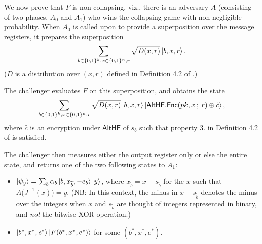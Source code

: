 \documentclass{article}
\begin{document}
We now prove that $F$ is non-collapsing, viz., there is an adversary $A$ (consisting of two phases, $A_0$ and $A_1$) who wins the collapsing game with non-negligible probability. When $A_0$ is called upon to provide a superposition over the message registers, it prepares the superposition
\begin{align}
    \sum_{b \in \{0,1\}^k, x \in \{0,1\}^n, r} \sqrt{D(x, r)} \ket{b, x, r}.
\end{align}
($D$ is a distribution over $(x, r)$ defined in Definition 4.2 of \cite{mahadev}.)

The challenger evaluates $F$ on this superposition, and obtains the state
\begin{align}
    \sum_{b \in \{0,1\}^k, x \in \{0,1\}^n, r} \sqrt{D(x, r)} \ket{b, x, r} \ket{\textsf{AltHE.Enc}(pk, x \:;\: r) \oplus \hat c},
\end{align}
where $\hat c$ is an encryption under $\textsf{AltHE}$ of $s_b$ such that property 3. in Definition 4.2 of \cite{mahadev} is satisfied.

The challenger then measures either the output register only or else the entire state, and returns one of the two following states to $A_1$:

\begin{itemize}
    \item $\ket{\psi_y} = \sum_{b} \alpha_{b} \ket{b, x_{\widetilde{b}}, -e_b} \ket{y}$, where $x_{\widetilde{b}} = x - s_{\widetilde{b}}$ for the $x$ such that $A\big( J^{-1}(x) \big) = y$. (NB: In this context, the minus in $x - s_{\widetilde{b}}$ denotes the minus over the integers when $x$ and $s_{\widetilde{b}}$ are thought of integers represented in binary, and \textit{not} the bitwise XOR operation.)
    \item $\ket{b^*, x^*, e^*} \ket{F(b^*, x^*, e^*)}$ for some $(b^*, x^*, e^*)$.
\end{itemize}
\end{document}
